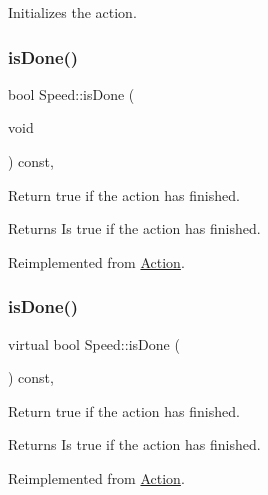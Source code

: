 Initializes the action. \mbox{\label{classSpeed_a6c357c4da932b6793c4626975546cb28}} 
\subsubsection{\texorpdfstring{is\+Done()}{isDone()}\hspace{0.1cm}{\footnotesize\ttfamily [1/2]}}
{\footnotesize\ttfamily bool Speed\+::is\+Done (\begin{DoxyParamCaption}\item[{void}]{ }\end{DoxyParamCaption}) const\hspace{0.3cm}{\ttfamily [override]}, {\ttfamily [virtual]}}

Return true if the action has finished.

\begin{DoxyReturn}{Returns}
Is true if the action has finished. 
\end{DoxyReturn}


Reimplemented from \hyperlink{classAction_a9b5dd627540a85f89f3e82acd46b7772}{Action}.

\mbox{\label{classSpeed_a6897f29e4fc1c8515fc12f9e98ebebef}} 
\subsubsection{\texorpdfstring{is\+Done()}{isDone()}\hspace{0.1cm}{\footnotesize\ttfamily [2/2]}}
{\footnotesize\ttfamily virtual bool Speed\+::is\+Done (\begin{DoxyParamCaption}{ }\end{DoxyParamCaption}) const\hspace{0.3cm}{\ttfamily [override]}, {\ttfamily [virtual]}}

Return true if the action has finished.

\begin{DoxyReturn}{Returns}
Is true if the action has finished. 
\end{DoxyReturn}


Reimplemented from \hyperlink{classAction_a9b5dd627540a85f89f3e82acd46b7772}{Action}.

\mbox{\label{classSpeed_a6662f73e93a1275be4655be85021f531}} 

